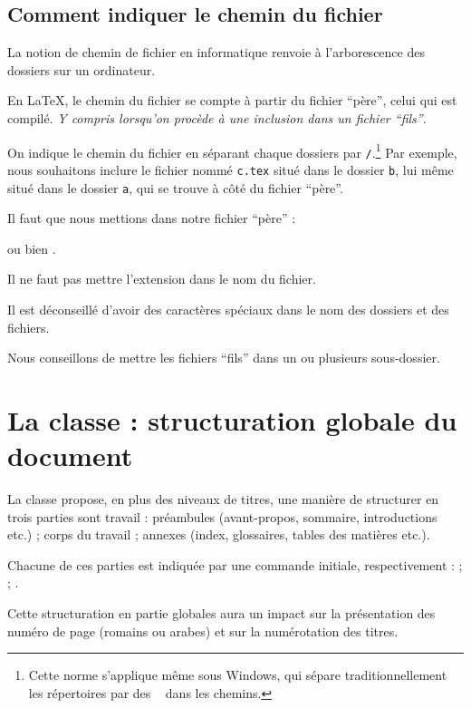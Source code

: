 \subsection{Comment indiquer le chemin du fichier}\label{chemin}

La notion de chemin de fichier en informatique renvoie à l'arborescence des dossiers sur un ordinateur.

En \LaTeX{}, le chemin du fichier se compte à partir du fichier \enquote{père}, celui qui est compilé. \emph{Y compris lorsqu'on procède à une inclusion dans un fichier \enquote{fils}}.

On indique le chemin du fichier en séparant chaque dossiers par \verb|/|.\footnote{Cette norme s'applique même sous Windows, qui sépare traditionnellement les répertoires par des \texttt{\ } dans les chemins.} Par exemple, nous souhaitons inclure le fichier nommé \verb|c.tex| situé dans le dossier \verb|b|, lui même situé dans le dossier \verb|a|, qui se trouve à côté du fichier \enquote{père}.

Il faut que nous mettions dans notre fichier \enquote{père} :

\verb|| ou bien \verb||.

\begin{attention}

Il ne faut pas mettre l'extension  dans le nom du fichier.

Il est déconseillé d'avoir des caractères spéciaux dans le nom des dossiers et des fichiers.
\end{attention}

Nous conseillons de mettre les fichiers \enquote{fils} dans un ou plusieurs sous-dossier.

\section{La classe  : structuration globale du document}

La classe  propose, en plus des niveaux de titres, une manière de structurer en trois parties sont travail : préambules (avant-propos, sommaire, introductions etc.) ; corps du travail ; annexes (index, glossaires, tables des matières etc.). 

Chacune de ces parties est indiquée par une commande initiale, respectivement :  ;  ; .

Cette structuration en partie globales aura un impact sur la présentation des numéro de page (romains ou arabes) et sur la numérotation des titres.

 
